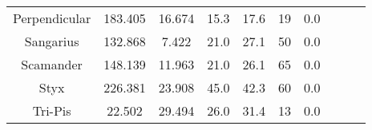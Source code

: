 \begin{table}
\begin{tabular}{cSSSSSSccc}
Perpendicular & 183.405 & 16.674 & 15.3 & 17.6 & 19 & 0.0 & \citet{weiss:2018} & &  \\
Sangarius & 132.868 & 7.422 & 21.0 & 27.1 & 50 & 0.0 & \citet{grillmair:2017} & &  \\
Scamander & 148.139 & 11.963 & 21.0 & 26.1 & 65 & 0.0 & \citet{grillmair:2017} & &  \\
Styx & 226.381 & 23.908 & 45.0 & 42.3 & 60 & 0.0 & \citet{grillmair:2009} & &  \\
Tri-Pis & 22.502 & 29.494 & 26.0 & 31.4 & 13 & 0.0 & \citet{bonaca:2012} & &  \\
\hline \hline
\end{tabular}
\end{table}
